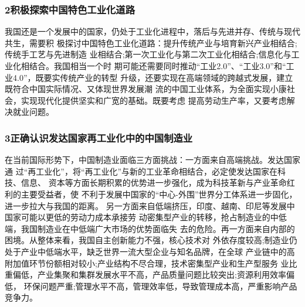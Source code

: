 \documentclass[11pt]{ctexart}
\begin{document}
{{{{\subsubsection{2积极探索中国特色工业化道路}
\label{sec:org2f1f59e}

我国还是一个发展中的国家，仍处于工业化进程中，落后与先进并存、传统与现代共生，需要积
极探讨中国特色工业化道路：提升传统产业与培育新兴产业相结合;传统手工艺与先进制造
业相结合;第一次工业化与第二次工业化相结合;信息化与工业化相结合。我国相当一个时
期可能还需要同时推动“工业2.0”、“工业3.0”和“工业4.0”，既要实传统产业的转型
升级，还要实现在高端领域的跨越式发展，建立既符合中国实际情况、又体现世界发展潮
流的中国工业体系，为全面实现小康社会，实现现代化提供坚实和广宽的基础。既要考虑
提高劳动生产率，又要考虑解决就业问题。

\subsubsection{3正确认识发达国家再工业化中的中国制造业}
\label{sec:orgcc5ab2e}

在当前国际形势下，中国制造业面临三方面挑战：一方面来自高端挑战。发达国家通
过“再工业化”，将“再工业化”与新的工业革命相结合，必定使发达国家在科技、信息、
资本等方面长期积累的优势进一步强化，成为科技革新与产业革命红利的主要受益者，使
不利于发展中国家的“中心-外围”世界分工体系进一步固化，进一步拉大与我国的距离。
另一方面来自低端挤压，印度、越南、印尼等发展中国家可能以更低的劳动力成本承接劳
动密集型产业的转移，抢占制造业的中低端，我国制造业在中低端广大市场的优势面临失
去的危险。再一方面来自内部的困境。从整体来看，我国自主创新能力不强，核心技术对
外依存度较高;制造业仍处于产业中低端水平，缺乏世界一流大型企业与知名品牌，在全球
产业链中的高附加值环节份额相对较小;产业结构不尽合理，技术密集型产业和生产型服务
业比重偏低，产业集聚和集群发展水平不高，产品质量问题比较突出;资源利用效率偏低，
环保问题严重;管理水平不高，管理效率低，导致管理成本高，严重影响产品竞争力。

}}}}
\end{document}
